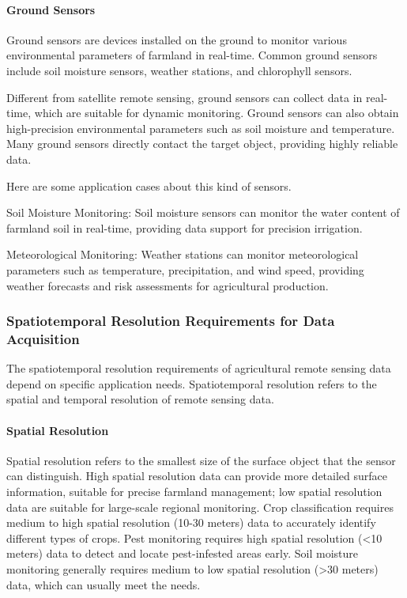 \paragraph{Ground Sensors}

Ground sensors are devices installed on the ground to monitor various environmental parameters of farmland in real-time. Common ground sensors include soil moisture sensors, weather stations, and chlorophyll sensors.

Different from satellite remote sensing, ground sensors can collect data in real-time, which are suitable for dynamic monitoring\cite{khanalRemoteSensingAgriculture2020}. Ground sensors can also obtain high-precision environmental parameters such as soil moisture and temperature. Many ground sensors directly contact the target object, providing highly reliable data.

Here are some application cases about this kind of sensors.

Soil Moisture Monitoring: Soil moisture sensors can monitor the water content of farmland soil in real-time, providing data support for precision irrigation.

Meteorological Monitoring: Weather stations can monitor meteorological parameters such as temperature, precipitation, and wind speed, providing weather forecasts and risk assessments for agricultural production.

\subsubsection{Spatiotemporal Resolution Requirements for Data Acquisition}

The spatiotemporal resolution requirements of agricultural remote sensing data depend on specific application needs. Spatiotemporal resolution refers to the spatial and temporal resolution of remote sensing data.

\paragraph{Spatial Resolution}

Spatial resolution refers to the smallest size of the surface object that the sensor can distinguish. High spatial resolution data can provide more detailed surface information, suitable for precise farmland management; low spatial resolution data are suitable for large-scale regional monitoring.
Crop classification requires medium to high spatial resolution (10-30 meters) data to accurately identify different types of crops. Pest monitoring requires high spatial resolution (<10 meters) data to detect and locate pest-infested areas early. Soil moisture monitoring generally requires medium to low spatial resolution (>30 meters) data, which can usually meet the needs.

